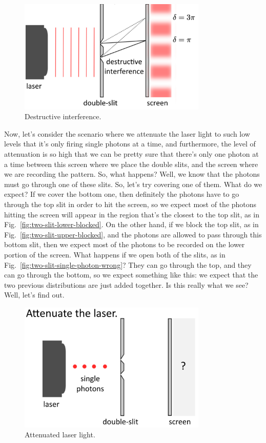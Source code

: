 \begin{figure}[H]
   \centering
    \includegraphics[width=0.8\textwidth]{lesson6/double_slit_destructive.pdf}
        \caption{Destructive interference.}
    \label{fig:two-slit-destructive}    
\end{figure}

Now, let's consider the scenario where we attenuate the laser light to such low levels that it's only firing single photons at a time, and furthermore, the level of attenuation is so high that we can be pretty sure that there's only one photon at a time between this screen where we place the double slits, and the screen where we are recording the pattern. So, what happens? Well, we know that the photons must go through one of these slits. So, let's try covering one of them. What do we expect? If we cover the bottom one, then definitely the photons have to go through the top slit in order to hit the screen, so we expect most of the photons hitting the screen will appear in the region that's the closest to the top slit, as in Fig.~\ref{fig:two-slit-lower-blocked}. On the other hand, if we block the top slit, as in Fig.~\ref{fig:two-slit-upper-blocked}, and the photons are allowed to pass through this bottom slit, then we expect most of the photons to be recorded on the lower portion of the screen. What happens if we open both of the slits, as in Fig.~\ref{fig:two-slit-single-photon-wrong}? They can go through the top, and they can go through the bottom, so we expect something like this: we expect that the two previous distributions are just added together. Is this really what we see? Well, let's find out. 

\begin{figure}[H]
   \centering
    \includegraphics[width=0.8\textwidth]{lesson6/attenuate_laser.pdf}    
        \caption{Attenuated laser light.}
    \label{fig:two-slit-attenuated}
\end{figure}


